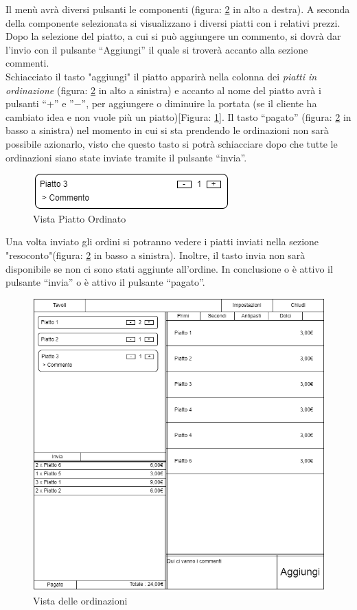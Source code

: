 \documentclass[12pt, letterpaper]{book}
\begin{document}
Il menù avrà diversi pulsanti le componenti (figura: \ref{Ordinazione} in alto a destra). A seconda della componente selezionata si visualizzano i diversi piatti con i relativi prezzi. Dopo la selezione del piatto, a cui si può aggiungere un commento, si dovrà dar l'invio con il pulsante “Aggiungi”  il quale si troverà accanto alla sezione commenti.
\medskip
\\Schiacciato il tasto "aggiungi" il piatto apparirà nella colonna dei \textit{piatti in ordinazione} (figura: \ref{Ordinazione} in alto a sinistra) e accanto al nome del piatto avrà i pulsanti “+” e ”$-$”, per aggiungere o diminuire la portata (se il cliente ha cambiato idea e non vuole più un piatto)[Figura: \ref{PiattoOrdinato}]. Il tasto “pagato” (figura: \ref{Ordinazione} in basso a sinistra) nel momento in cui si sta prendendo le ordinazioni non sarà possibile azionarlo, visto che questo tasto si potrà schiacciare dopo che tutte le ordinazioni siano state inviate tramite il pulsante “invia”.
\begin{figure}[h]
    \centering
    \includegraphics[width = 0.5 \linewidth]{../Documentazione/Drawio/PiattoOrdinato.png}
    \caption{Vista Piatto Ordinato}
    \label{PiattoOrdinato}
\end{figure}

Una volta inviato gli ordini si potranno vedere i piatti inviati nella sezione "resoconto"(figura: \ref{Ordinazione} in basso a sinistra). Inoltre, il tasto invia non sarà disponibile se non ci sono stati aggiunte all'ordine. In conclusione o è attivo il pulsante “invia” o è attivo il pulsante “pagato”.

\begin{figure}[h]
    \centering
    \includegraphics[width = 0.7 \linewidth]{../Documentazione/Drawio/Ordinazione.png}
    \caption{Vista delle ordinazioni}
    \label{Ordinazione}
\end{figure}
\end{document}
